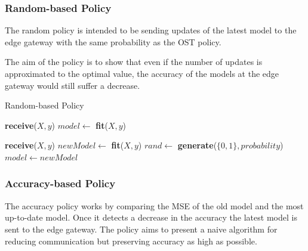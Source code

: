 \documentclass{mpaper}
\begin{document}
\subsubsection{Random-based Policy}
The random policy is intended to be sending updates of the latest model to the edge gateway with the same probability as the OST policy.

The aim of the policy is to show that even if the number of updates is approximated to the optimal value, the accuracy of the models at the edge gateway would still suffer a decrease.

\begin{algorithm}[h]
\caption{Random-based Policy}\label{polR}
\begin{algorithmic}
\State  \textbf{receive}($X,y$)
\State $model \gets$ \textbf{fit}($X,y$)

    \State \textbf{receive}($X, y$)
    \State $newModel \gets$ \textbf{fit}($X,y$)
    \State $rand \gets$ \textbf{generate}($\{0,1\},probability$)
        \State $model \gets newModel$ 
    \EndIf
\EndWhile
\end{algorithmic}
\end{algorithm}



\subsubsection{Accuracy-based Policy}
The accuracy policy works by comparing the MSE of the old model and the most up-to-date model. Once it detects a decrease in the accuracy the latest model is sent to the edge gateway.
The policy aims to present a naive algorithm for reducing communication but preserving accuracy as high as possible.

\end{document}
